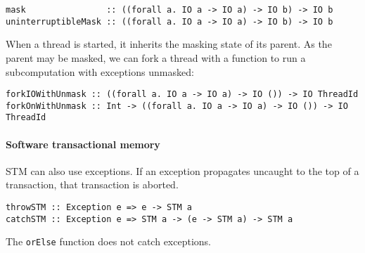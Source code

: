 \begin{verbatim}
mask                :: ((forall a. IO a -> IO a) -> IO b) -> IO b
uninterruptibleMask :: ((forall a. IO a -> IO a) -> IO b) -> IO b
\end{verbatim}

When a thread is started, it inherits the masking state of its parent.  As the
parent may be masked, we can fork a thread with a function to run a
subcomputation with exceptions unmasked:

\begin{verbatim}
forkIOWithUnmask :: ((forall a. IO a -> IO a) -> IO ()) -> IO ThreadId
forkOnWithUnmask :: Int -> ((forall a. IO a -> IO a) -> IO ()) -> IO ThreadId
\end{verbatim}

\paragraph{Software transactional memory}
STM can also use exceptions.  If an exception propagates uncaught to the top of
a transaction, that transaction is aborted.

\begin{verbatim}
throwSTM :: Exception e => e -> STM a
catchSTM :: Exception e => STM a -> (e -> STM a) -> STM a
\end{verbatim}

The \verb|orElse| function does not catch exceptions.
